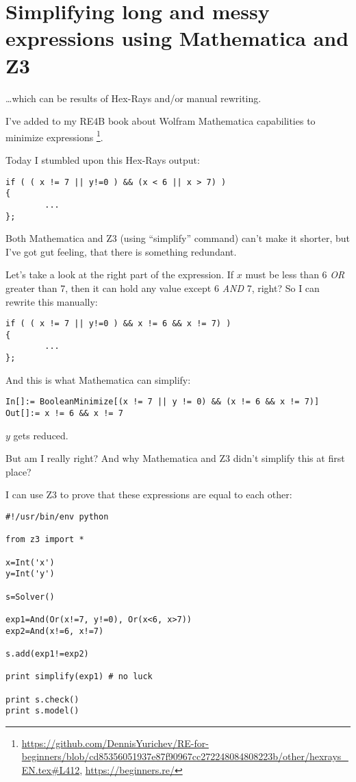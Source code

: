\section{Simplifying long and messy expressions using Mathematica and Z3}

\dots which can be results of Hex-Rays and/or manual rewriting.

I've added to my RE4B book about Wolfram Mathematica capabilities to minimize expressions
\footnote{\url{https://github.com/DennisYurichev/RE-for-beginners/blob/cd85356051937e87f90967cc272248084808223b/other/hexrays_EN.tex\#L412}, \url{https://beginners.re/}}.

Today I stumbled upon this Hex-Rays output:

\begin{lstlisting}
if ( ( x != 7 || y!=0 ) && (x < 6 || x > 7) )
{
        ...
};
\end{lstlisting}

Both Mathematica and Z3 (using ``simplify'' command) can't make it shorter, but I've got gut feeling,
that there is something redundant.

Let's take a look at the right part of the expression.
If $x$ must be less than 6 \emph{OR} greater than 7, then it can hold any value except 6 \emph{AND} 7, right?
So I can rewrite this manually:

\begin{lstlisting}
if ( ( x != 7 || y!=0 ) && x != 6 && x != 7) )
{
        ...
};
\end{lstlisting}

And this is what Mathematica can simplify:

\begin{lstlisting}
In[]:= BooleanMinimize[(x != 7 || y != 0) && (x != 6 && x != 7)]
Out[]:= x != 6 && x != 7
\end{lstlisting}

$y$ gets reduced.

But am I really right?
And why Mathematica and Z3 didn't simplify this at first place?

I can use Z3 to prove that these expressions are equal to each other:

\begin{lstlisting}
#!/usr/bin/env python

from z3 import *

x=Int('x')
y=Int('y')

s=Solver()

exp1=And(Or(x!=7, y!=0), Or(x<6, x>7))
exp2=And(x!=6, x!=7)

s.add(exp1!=exp2)

print simplify(exp1) # no luck

print s.check()
print s.model()
\end{lstlisting}

